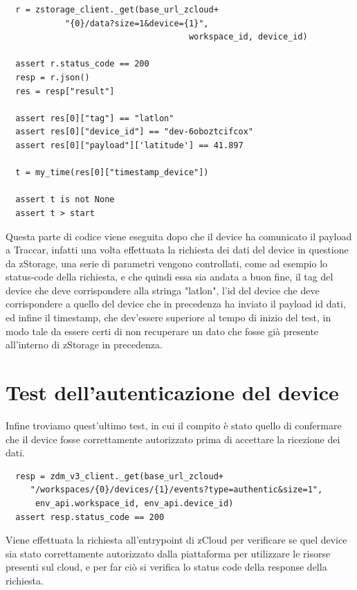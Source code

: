 \documentclass[a4paper,titlepage,12pt]{report}
\begin{document}
{\begin{verbatim}
  r = zstorage_client._get(base_url_zcloud+
  			"{0}/data?size=1&device={1}",
                                     workspace_id, device_id)  
   
  assert r.status_code == 200
  resp = r.json()       
  res = resp["result"]

  assert res[0]["tag"] == "latlon"
  assert res[0]["device_id"] == "dev-6oboztcifcox"
  assert res[0]["payload"]['latitude'] == 41.897

  t = my_time(res[0]["timestamp_device"])
  
  assert t is not None
  assert t > start 
\end{verbatim}


\noindent Questa parte di codice viene eseguita dopo che il device ha comunicato il payload a Traccar, infatti una volta effettuata la richiesta dei dati del device in questione da zStorage, una serie di parametri vengono controllati, come ad esempio lo status-code della richiesta, e che quindi essa sia andata a buon fine, il tag del device che deve corrispondere alla stringa "latlon", l'id del device che deve corrispondere a quello del device che in precedenza ha inviato il payload id dati, ed infine il timestamp, che dev'essere superiore al tempo di inizio del test, in modo tale da essere certi di non recuperare un dato che fosse già presente all'interno di zStorage in precedenza.

\section{
Test dell'autenticazione del device}
Infine troviamo quest'ultimo test, in cui il compito è stato quello di confermare che il device fosse correttamente autorizzato prima di accettare la ricezione dei dati.

\begin{verbatim}
  resp = zdm_v3_client._get(base_url_zcloud+
     "/workspaces/{0}/devices/{1}/events?type=authentic&size=1",           
      env_api.workspace_id, env_api.device_id)
  assert resp.status_code == 200
\end{verbatim}


\noindent Viene effettuata la richiesta all'entrypoint di zCloud per verificare se quel device sia stato correttamente autorizzato dalla piattaforma per utilizzare le risorse presenti sul cloud, e per far ciò si verifica lo status code della response della richiesta.

}
\end{document}
